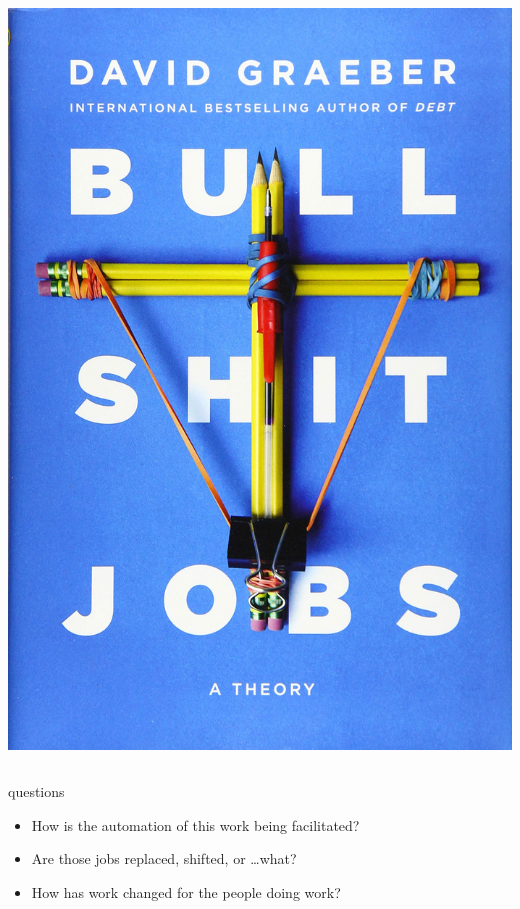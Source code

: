 \documentclass[aspectratio=43,17pt]{beamer} %
\begin{document}
\begin{frame}[plain]
\begin{columns}
\begin{column}{0.3\textwidth}
    \includegraphics[width=\textwidth]{figures/books/bullshit_jobs.jpeg}
\end{column}
\end{columns}

\end{frame}


\begin{frame}[plain]
\centering
{}

\end{frame}



\begin{frame}{questions}
    
\begin{itemize}
    \item How is the automation of this work being facilitated?
    \item Are those jobs replaced, shifted, or \dots what?
    \item How has work changed for the people doing work?
\end{itemize}

\end{frame}
\end{document}
